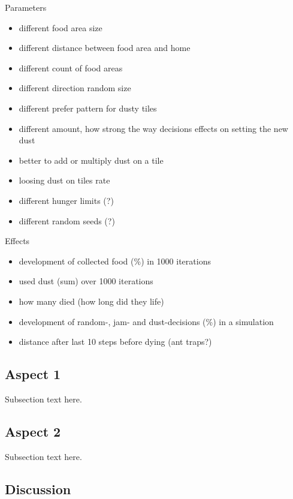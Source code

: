 Parameters

\begin{itemize}
\tightlist
\item
  different food area size
\item
  different distance between food area and home
\item
  different count of food areas
\item
  different direction random size
\item
  different prefer pattern for dusty tiles
\item
  different amount, how strong the way decisions effects on setting the
  new dust
\item
  better to add or multiply dust on a tile
\item
  loosing dust on tiles rate
\item
  different hunger limits (?)
\item
  different random seeds (?)
\end{itemize}

Effects

\begin{itemize}
\tightlist
\item
  development of collected food (\%) in 1000 iterations
\item
  used dust (sum) over 1000 iterations
\item
  how many died (how long did they life)
\item
  development of random-, jam- and dust-decisions (\%) in a simulation
\item
  distance after last 10 steps before dying (ant traps?)
\end{itemize}

\subsection{Aspect 1}\label{aspect-1}

Subsection text here.

\subsection{Aspect 2}\label{aspect-2}

Subsection text here.

\subsection{Discussion}\label{discussion}

